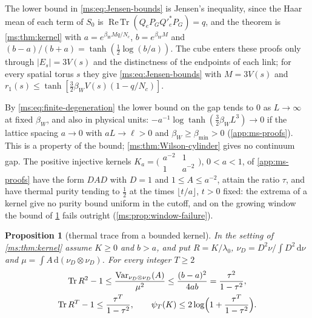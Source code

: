 \documentclass[11pt,a4paper]{amsart}
\newtheorem{proposition}[theorem]{Proposition}
\theoremstyle{definition}
\theoremstyle{remark}
\numberwithin{equation}{section}
\DeclareMathOperator{\Tr}{Tr}        %
\DeclareMathOperator{\ReTr}{Re\,Tr}  %
\DeclareMathOperator{\Var}{Var}      %
\newcommand{\abs}[1]{\lvert #1\rvert}      %
\newcommand{\dd}{\,\mathrm{d}}             %
\newcommand{\Vol}[1]{V(#1)}                %
\newcommand{\betaW}{\beta_{W}}             %
\begin{document}
The lower bound in \eqref{ms:eq:Jensen-bounds} is Jensen's inequality, since the Haar mean of each term of $S_0$ is $\ReTr(Q_eP_GQ'^*_eP_G)=q$, and the theorem is \cref{ms:thm:kernel} with $a=e^{\betaW Mq/N_c}$, $b=e^{\betaW M}$ and $(b-a)/(b+a)=\tanh(\frac12\log(b/a))$. The cube enters these proofs only through $\abs{E_s}=3\Vol{s}$ and the distinctness of the endpoints of each link; for every spatial torus $s$ they give \eqref{ms:eq:Jensen-bounds} with $M=3\Vol{s}$ and $r_1(s)\le\tanh[\frac32\betaW\Vol{s}(1-q/N_c)]$.

By \eqref{ms:eq:finite-degeneration} the lower bound on the gap tends to $0$ as $L\to\infty$ at fixed $\betaW$, and also in physical units: $-a^{-1}\log\tanh(\frac32\betaW L^3)\to0$ if the lattice spacing $a\to0$ with $aL\to\ell>0$ and $\betaW\ge\beta_{\min}>0$ (\cref{app:ms-proofs}). This is a property of the bound; \cref{ms:thm:Wilson-cylinder} gives no continuum gap. The positive injective kernels $K_a=\bigl(\begin{smallmatrix}a^{-2}&1\\1&a^{-2}\end{smallmatrix}\bigr)$, $0<a<1$, of \cref{app:ms-proofs} have the form $DAD$ with $D=1$ and $1\le A\le a^{-2}$, attain the ratio $\tau$, and have thermal purity tending to $\frac12$ at the times $\lfloor t/a\rfloor$, $t>0$ fixed: the extrema of a kernel give no purity bound uniform in the cutoff, and on the growing window the bound of \cref{ms:prop:kernel-trace} fails outright (\cref{ms:prop:window-failure}).

\begin{proposition}[thermal trace from a bounded kernel]\label{ms:prop:kernel-trace}
In the setting of \cref{ms:thm:kernel} assume $K\ge0$ and $b>a$, and put $R=K/\lambda_0$, $\nu_D=D^2\nu/\int D^2\dd\nu$ and $\mu=\int A\dd(\nu_D\otimes\nu_D)$. For every integer $T\ge2$
\begin{gather*}
\Tr R^2-1\le\frac{\Var_{\nu_D\otimes\nu_D}(A)}{\mu^2}\le\frac{(b-a)^2}{4ab}=\frac{\tau^2}{1-\tau^2},\\
\Tr R^T-1\le\frac{\tau^T}{1-\tau^2},\qquad \psi_T(K)\le2\log\Bigl(1+\frac{\tau^T}{1-\tau^2}\Bigr).
\end{gather*}
\end{proposition}
\end{document}
